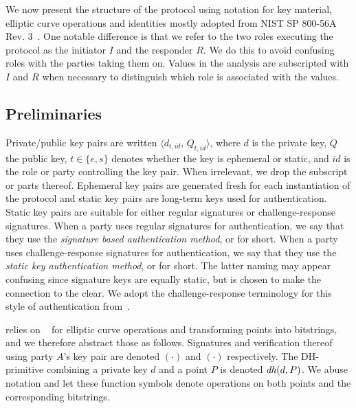 We now present the structure of the protocol using notation for key material,
elliptic curve operations and
identities mostly adopted from NIST SP 800-56A Rev. 3~\cite{sp800-56a-rev3}.
%
One notable difference is that we refer to the two roles executing the protocol
as the initiator $I$ and the responder $R$.
%
We do this to avoid confusing roles with the parties taking them on.
%
Values in the analysis are subscripted with $I$ and $R$ when necessary to
distinguish which role is associated with the values.
%

\subsection{Preliminaries}
\label{sec:preliminaries}
Private/public key pairs are written
$\langle d_{t,\mathit{id}},\,Q_{t,\mathit{id}}\rangle$,
where $d$ is the private key, $Q$ the public key, $t \in \{e, s\}$ denotes
whether the key is ephemeral or static, and $\mathit{id}$ is the role or
party controlling the key pair.
%
When irrelevant, we drop the subscript or parts thereof.
%
Ephemeral key pairs are generated fresh for each instantiation of the protocol
and static key pairs are long-term keys used for authentication.
%
Static key pairs are suitable for either regular signatures or
challenge-response signatures.
%
When a party uses regular signatures for authentication, we say that they use
the \emph{signature based authentication method}, or \mSig{} for short.
%
When a party uses challenge-response signatures for authentication, we say that
they use the \emph{static key authentication method}, or \mStat{} for short.
%
The latter naming may appear confusing since signature keys are equally static,
but is chosen to make the connection to the \mSpec{} clear.
%
We adopt the challenge-response terminology for this style of authentication
from~\cite{DBLP:conf/crypto/Krawczyk05}.
%

\mEdhoc{} relies on \mCose{}~\cite{rfc8152} for elliptic curve operations and
transforming points into bitstrings, and we therefore abstract those as
follows.
%
Signatures and verification thereof using party $A$'s key pair are
denoted $(\cdot)$ and $(\cdot)$ respectively.
%
The DH-primitive combining a private key $d$ and a point $P$ is denoted
$\mathit{dh}(d,P)$.
%
We abuse notation and let these function symbols denote operations on both
points and the corresponding bitstrings.
%

